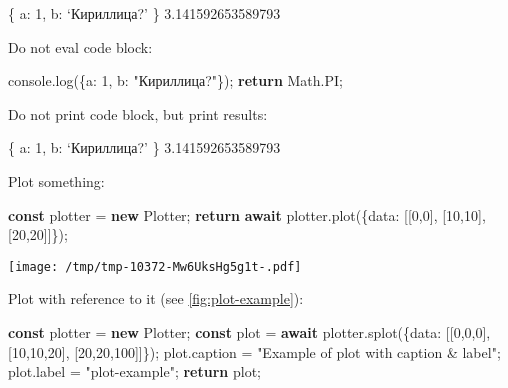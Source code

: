 \documentclass[12pt,russian,a4paper,,fleqn]{extarticle}
\newenvironment{Shaded}{}{}
\newcommand{\AttributeTok}[1]{\textcolor[rgb]{0.49,0.56,0.16}{#1}}
\newcommand{\BuiltInTok}[1]{#1}
\newcommand{\ConstantTok}[1]{\textcolor[rgb]{0.53,0.00,0.00}{#1}}
\newcommand{\ControlFlowTok}[1]{\textcolor[rgb]{0.00,0.44,0.13}{\textbf{#1}}}
\newcommand{\DataTypeTok}[1]{\textcolor[rgb]{0.56,0.13,0.00}{#1}}
\newcommand{\DecValTok}[1]{\textcolor[rgb]{0.25,0.63,0.44}{#1}}
\newcommand{\FunctionTok}[1]{\textcolor[rgb]{0.02,0.16,0.49}{#1}}
\newcommand{\KeywordTok}[1]{\textcolor[rgb]{0.00,0.44,0.13}{\textbf{#1}}}
\newcommand{\NormalTok}[1]{#1}
\newcommand{\OperatorTok}[1]{\textcolor[rgb]{0.40,0.40,0.40}{#1}}
\newcommand{\StringTok}[1]{\textcolor[rgb]{0.25,0.44,0.63}{#1}}
\theoremstyle{definition}\newtheorem{definition}{Определение}
\theoremstyle{remark}\newtheorem*{remark}{Примечание}
\numberwithin{equation}{section}
\begin{document}
\{ a: 1, b: `Кириллица?' \} 3.141592653589793

Do not eval code block:

\begin{Shaded}
\begin{Highlighting}[]
\BuiltInTok{console}\OperatorTok{.}\FunctionTok{log}\NormalTok{(\{}\DataTypeTok{a}\OperatorTok{:} \DecValTok{1}\OperatorTok{,} \DataTypeTok{b}\OperatorTok{:} \StringTok{"Кириллица?"}\NormalTok{\})}\OperatorTok{;}
\ControlFlowTok{return} \BuiltInTok{Math}\OperatorTok{.}\ConstantTok{PI}\OperatorTok{;}
\end{Highlighting}
\end{Shaded}

Do not print code block, but print results:

\{ a: 1, b: `Кириллица?' \} 3.141592653589793

Plot something:

\begin{Shaded}
\begin{Highlighting}[]
\KeywordTok{const}\NormalTok{ plotter }\OperatorTok{=} \KeywordTok{new}\NormalTok{ Plotter}\OperatorTok{;}
\ControlFlowTok{return} \ControlFlowTok{await}\NormalTok{ plotter}\OperatorTok{.}\FunctionTok{plot}\NormalTok{(\{}\DataTypeTok{data}\OperatorTok{:}\NormalTok{ [[}\DecValTok{0}\OperatorTok{,}\DecValTok{0}\NormalTok{]}\OperatorTok{,}\NormalTok{ [}\DecValTok{10}\OperatorTok{,}\DecValTok{10}\NormalTok{]}\OperatorTok{,}\NormalTok{ [}\DecValTok{20}\OperatorTok{,}\DecValTok{20}\NormalTok{]]\})}\OperatorTok{;}
\end{Highlighting}
\end{Shaded}

\texttt{[image: /tmp/tmp-10372-Mw6UksHg5g1t-.pdf]}

Plot with reference to it (see \ref{fig:plot-example}):

\begin{Shaded}
\begin{Highlighting}[]
\KeywordTok{const}\NormalTok{ plotter }\OperatorTok{=} \KeywordTok{new}\NormalTok{ Plotter}\OperatorTok{;}
\KeywordTok{const}\NormalTok{ plot }\OperatorTok{=} \ControlFlowTok{await}\NormalTok{ plotter}\OperatorTok{.}\FunctionTok{splot}\NormalTok{(\{}\DataTypeTok{data}\OperatorTok{:}\NormalTok{ [[}\DecValTok{0}\OperatorTok{,}\DecValTok{0}\OperatorTok{,}\DecValTok{0}\NormalTok{]}\OperatorTok{,}\NormalTok{ [}\DecValTok{10}\OperatorTok{,}\DecValTok{10}\OperatorTok{,}\DecValTok{20}\NormalTok{]}\OperatorTok{,}\NormalTok{ [}\DecValTok{20}\OperatorTok{,}\DecValTok{20}\OperatorTok{,}\DecValTok{100}\NormalTok{]]\})}\OperatorTok{;}
\NormalTok{plot}\OperatorTok{.}\AttributeTok{caption} \OperatorTok{=} \StringTok{"Example of plot with caption \& label"}\OperatorTok{;}
\NormalTok{plot}\OperatorTok{.}\AttributeTok{label} \OperatorTok{=} \StringTok{"plot{-}example"}\OperatorTok{;}
\ControlFlowTok{return}\NormalTok{ plot}\OperatorTok{;}
\end{Highlighting}
\end{Shaded}
\end{document}
